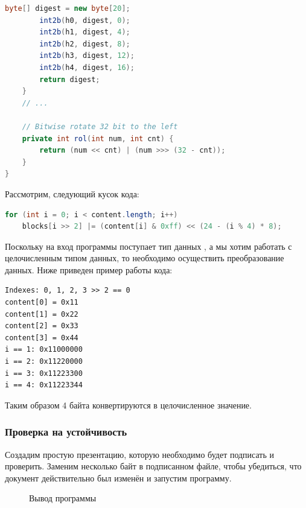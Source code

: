 \begin{lstlisting}[language=Java]
        byte[] digest = new byte[20];
        int2b(h0, digest, 0);
        int2b(h1, digest, 4);
        int2b(h2, digest, 8);
        int2b(h3, digest, 12);
        int2b(h4, digest, 16);
        return digest;
    }
    // ...

    // Bitwise rotate 32 bit to the left
    private int rol(int num, int cnt) {
        return (num << cnt) | (num >>> (32 - cnt));
    }
} 
\end{lstlisting}

Рассмотрим, следующий кусок кода:
\begin{lstlisting}[language=Java]
for (int i = 0; i < content.length; i++)
    blocks[i >> 2] |= (content[i] & 0xff) << (24 - (i % 4) * 8);
\end{lstlisting}

Поскольку на вход программы поступает тип данных , а мы хотим работать с целочисленным типом данных,
то необходимо осуществить преобразование данных. Ниже приведен пример работы кода:
\begin{verbatim}
Indexes: 0, 1, 2, 3 >> 2 == 0
content[0] = 0x11
content[1] = 0x22
content[2] = 0x33
content[3] = 0x44
i == 1: 0x11000000
i == 2: 0x11220000
i == 3: 0x11223300
i == 4: 0x11223344
\end{verbatim}

Таким образом 4 байта конвертируются в целочисленное значение.

\subsubsection{Проверка на устойчивость}

Создадим простую презентацию, которую необходимо будет подписать и проверить.
Заменим несколько байт в подписанном файле, чтобы убедиться, что документ действительно был изменён и запустим программу.

\begin{figure}[h!]
  \caption{Вывод программы}
\end{figure}

